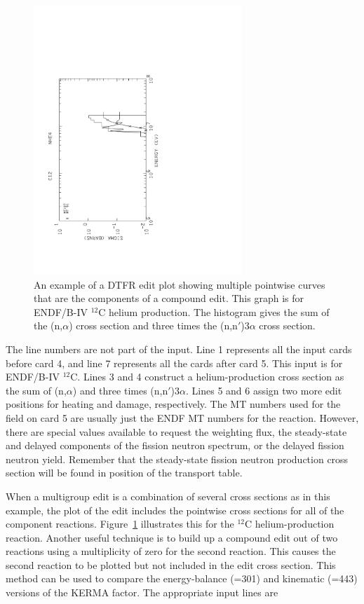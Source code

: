 \begin{figure}[b]\centering
\includegraphics[keepaspectratio, height=4.0in, angle=270]{figs/dtfr6ack}
\caption[DTFR plot example, compound edit]{An example of a DTFR edit plot
   showing multiple pointwise curves that are the components
   of a compound edit.  This graph is for ENDF/B-IV $^{12}$C
   helium production.  The histogram gives the sum of the
   (n,$\alpha$) cross section and three times the
   (n,n$'$)3$\alpha$ cross section.}
\label{mult}
\end{figure}

\noindent
The line numbers are not part of the input.  Line 1 represents all
the input cards before card 4, and line 7 represents all the
cards after card 5.  This input is for ENDF/B-IV $^{12}$C.
Lines 3 and 4 construct a helium-production cross section as
the sum of (n,$\alpha$) and three times (n,n$'$)3$\alpha$.
Lines 5 and 6 assign two more edit positions for heating and
damage, respectively.  The MT numbers used for the 
field on card 5 are usually just the ENDF MT numbers for the
reaction.  However, there are special values available
to request the weighting flux, the steady-state and delayed
components of the fission neutron spectrum, or the delayed
fission neutron yield.  Remember that the steady-state fission
neutron production cross section will be found in position
 of the transport table.

When a multigroup edit is a combination of several cross sections
as in this example, the plot of the edit includes the pointwise
cross sections for all of the component reactions.  Figure~\ref{mult}
illustrates this for the $^{12}$C helium-production reaction.
Another useful technique is to build up a compound edit out of two
reactions using a multiplicity of zero for the second reaction.
This causes the second reaction to be plotted but not included in
the edit cross section.  This method can be used to compare the
energy-balance (=301) and kinematic (=443) versions of the
KERMA factor.  The appropriate input lines are

